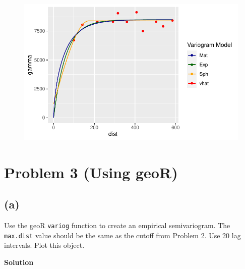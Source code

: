\documentclass[
  letterpaper,
  DIV=11,
  numbers=noendperiod]{scrartcl}
\newenvironment{Shaded}{\begin{snugshade}}{\end{snugshade}}
\newcommand{\AttributeTok}[1]{\textcolor[rgb]{0.40,0.45,0.13}{#1}}
\newcommand{\CommentTok}[1]{\textcolor[rgb]{0.37,0.37,0.37}{#1}}
\newcommand{\DecValTok}[1]{\textcolor[rgb]{0.68,0.00,0.00}{#1}}
\newcommand{\FunctionTok}[1]{\textcolor[rgb]{0.28,0.35,0.67}{#1}}
\newcommand{\NormalTok}[1]{\textcolor[rgb]{0.00,0.23,0.31}{#1}}
\newcommand{\OtherTok}[1]{\textcolor[rgb]{0.00,0.23,0.31}{#1}}
\newcommand{\SpecialCharTok}[1]{\textcolor[rgb]{0.37,0.37,0.37}{#1}}
\newcommand{\StringTok}[1]{\textcolor[rgb]{0.13,0.47,0.30}{#1}}
\begin{document}
\begin{figure}[H]

{\centering \includegraphics{geo-hw-spdep_files/figure-pdf/unnamed-chunk-5-1.pdf}

}

\end{figure}

\hypertarget{problem-3-using-geor}{%
\section{\texorpdfstring{Problem 3 (Using
\textbf{geoR})}{Problem 3 (Using geoR)}}\label{problem-3-using-geor}}

\hypertarget{a-1}{%
\subsection{(a)}\label{a-1}}

Use the geoR \texttt{variog} function to create an empirical
semivariogram. The \texttt{max.dist} value should be the same as the
cutoff from Problem 2. Use 20 lag intervals. Plot this object.

\textbf{Solution}

\begin{Shaded}
\end{Shaded}
\end{document}
